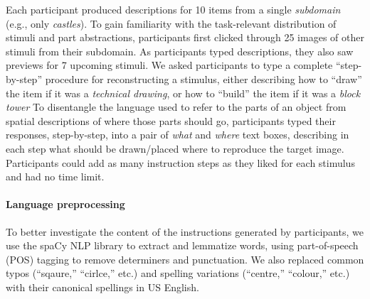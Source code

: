 \documentclass[10pt,letterpaper]{article}
\begin{document}
Each participant produced descriptions for 10 items from a single \textit{subdomain} (e.g., only \textit{castles}). 
To gain familiarity with the task-relevant distribution of stimuli and part abstractions, participants first clicked through 25 images of other stimuli from their subdomain. 
As participants typed descriptions, they also saw previews for 7 upcoming stimuli.
We asked participants to type a complete ``step-by-step'' procedure for reconstructing a stimulus, either describing how to ``draw'' the item if it was a \textit{technical drawing}, or how to ``build'' the item if it was a \textit{block tower} To disentangle the language used to refer to the parts of an object from spatial descriptions of where those parts should go, participants typed their responses, step-by-step, into a pair of \textit{what} and \textit{where} text boxes, describing in each step what should be drawn/placed where to reproduce the target image. Participants could add as many instruction steps as they liked for each stimulus and had no time limit.


\paragraph{Language preprocessing} %
To better investigate the content of the instructions generated by participants, we use the spaCy NLP library to extract and lemmatize words, using part-of-speech (POS) tagging to remove determiners and punctuation. We also replaced common typos (``sqaure,'' ``cirlce,'' etc.) and spelling variations (``centre,'' ``colour,'' etc.) with their canonical spellings in US English.
\end{document}

